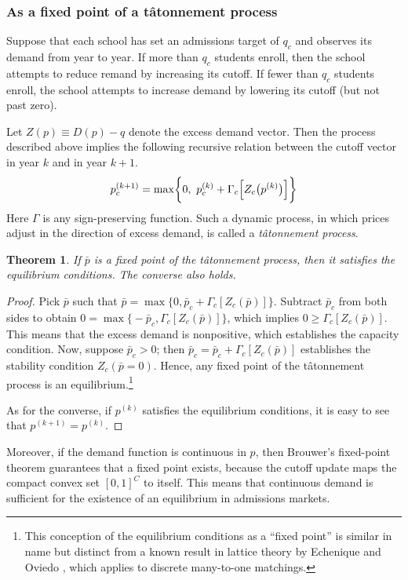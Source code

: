 \documentclass[12pt]{article}
\numberwithin{equation}{subsection}
\newtheorem{theorem}{Theorem}
\theoremstyle{definition}
\begin{document}
\subsubsection{As a fixed point of a t\^{a}tonnement process} \label{asafixedpoint}
Suppose that each school has set an admissions target of $q_c$ and observes its demand from year to year. If more than $q_c$ students enroll, then the school attempts to reduce remand by increasing its cutoff. If fewer than $q_c$ students enroll, the school attempts to increase demand by lowering its cutoff (but not past zero). 

Let $Z(p) \equiv D(p) - q$ denote the excess demand vector. Then the process described above implies the following recursive relation between the cutoff vector in year $k$ and in year $k+1$.
\begin{align} \label{tatonnementdef}
p_c^{(k+1)} = \max\biggl\{0,~p_c^{(k)}+ \Gamma_c\Bigl[Z_c\bigl(p^{(k)}\bigr)\Bigr] \biggr\}
\end{align}
Here $\Gamma$ is any sign-preserving function. Such a dynamic process, in which prices adjust in the direction of excess demand, is called a \emph{t\^{a}tonnement process}.
\begin{theorem}
If $\bar p$ is a fixed point of the t\^{a}tonnement process, then it satisfies the equilibrium conditions. The converse also holds.
\end{theorem}
\begin{proof} Pick $\bar p$ such that $\bar p = \max\bigl\{0, \bar p_c + \Gamma_c\left[Z_c(\bar p)\right] \bigr\}$. Subtract $\bar p_c$ from both sides to obtain $0 = \max\bigl\{-\bar p_c,\Gamma_c\left[Z_c(\bar p)\right] \bigr\}$, which implies $0 \geq \Gamma_c\left[Z_c(\bar p)\right]$. This means that the excess demand is nonpositive, which establishes the capacity condition. Now, suppose $\bar p_c > 0$; then $\bar p_c =  \bar p_c + \Gamma_c\left[Z_c(\bar p)\right] $ establishes the stability condition $Z_c(\bar p = 0)$. Hence, any fixed point of the t\^{a}tonnement process is an equilibrium.\footnote{This conception of the equilibrium conditions as a ``fixed point'' is similar in name but distinct from a known result in lattice theory by Echenique and Oviedo \parencite*{coremanytoonebyfixedpoint}, which applies to discrete many-to-one matchings.}

As for the converse, if $p^{(k)}$ satisfies the equilibrium conditions, it is easy to see that $p^{(k+1)} = p^{(k)}$. \end{proof}

Moreover, if the demand function is continuous in $p$, then Brouwer's fixed-point theorem guarantees that a fixed point exists, because the cutoff update maps the compact convex set $[0, 1]^C$ to itself. This means that continuous demand is sufficient for the existence of an equilibrium in admissions markets. 
\end{document}
